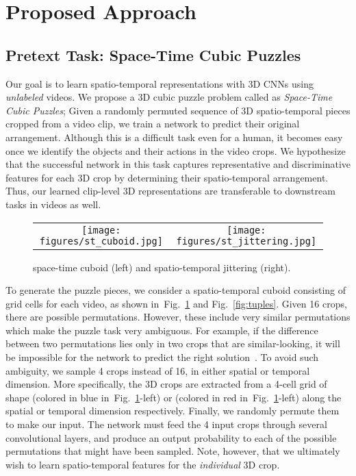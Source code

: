 \documentclass[letterpaper]{article} \usepackage{aaai19}  \usepackage{times}  \usepackage{helvet}  \usepackage{courier}  \usepackage{url}  \usepackage{graphicx}  \frenchspacing  \setlength{\pdfpagewidth}{8.5in}  \setlength{\pdfpageheight}{11in}
\newcommand{\figref}[1]{Fig.~\ref{#1}}
\begin{document}
\section{Proposed Approach}
\subsection{Pretext Task: Space-Time Cubic Puzzles}
Our goal is to learn spatio-temporal representations with 3D CNNs using \textit{unlabeled} videos. We propose a 3D cubic puzzle problem called as \textit{Space-Time Cubic Puzzles}; Given a randomly permuted sequence of 3D spatio-temporal pieces cropped from a video clip, we train a network to predict their original arrangement. Although this is a difficult task even for a human, it becomes easy once we identify the objects and their actions in the video crops. 
We hypothesize that the successful network in this task captures representative and discriminative features for each 3D crop by determining their spatio-temporal arrangement. Thus, our learned clip-level 3D representations are transferable to downstream tasks in videos as well.



\begin{figure}[t]
\begin{center}
\def\arraystretch{1.0}
\begin{tabular}{@{}c@{\hskip 0.01\textwidth}c@{}}
\texttt{[image: figures/st\_cuboid.jpg]} &
\texttt{[image: figures/st\_jittering.jpg]} \\
\end{tabular}
\end{center}
\caption{space-time cuboid (left) and spatio-temporal jittering (right).}
\label{fig:cuboid}
\end{figure}


To generate the puzzle pieces, we consider a spatio-temporal cuboid consisting of  grid cells for each video, as shown in~\figref{fig:cuboid} and \figref{fig:tuples}. Given 16 crops, there are  possible permutations. However, these include very similar permutations which make the puzzle task very ambiguous. For example, if the difference between two permutations lies only in two crops that are similar-looking, it will be impossible for the network to predict the right solution~\cite{noroozi2016unsupervised}. To avoid such ambiguity, we sample 4 crops instead of 16, in either spatial or temporal dimension. More specifically, the 3D crops are extracted from a 4-cell grid of shape  (colored in blue in~\figref{fig:cuboid}-left) or  (colored in red in~\figref{fig:cuboid}-left) along the spatial or temporal dimension respectively. Finally, we randomly permute them to make our input. The network must feed the 4 input crops through several convolutional layers, and produce an output probability to each of the possible permutations that might have been sampled. Note, however, that we ultimately wish to learn spatio-temporal features for the \textit{individual} 3D crop.  
\end{document}
